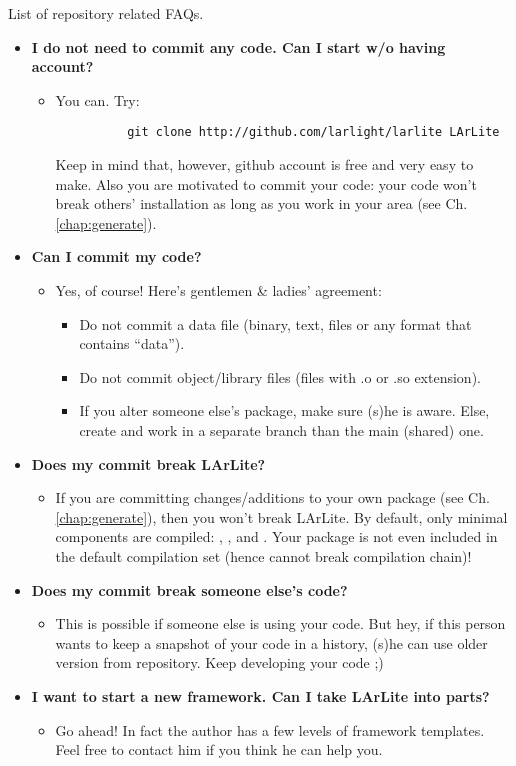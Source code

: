 List of repository related FAQs.

\begin{itemize}

  \item[]{\bf I do not need to commit any code. Can I start w/o having \git account?}
    \begin{itemize}
      \item You can. Try:
        \begin{lstlisting}
          git clone http://github.com/larlight/larlite LArLite
        \end{lstlisting}
        Keep in mind that, however, github account is free and very easy to make. Also you are motivated to commit your code: your code won't break others' installation as long as you work in your area (see Ch.\ref{chap:generate}).
    \end{itemize}

  \item[]{\bf Can I commit my code?}
    \begin{itemize}
      \item Yes, of course! Here's gentlemen \& ladies' agreement:
        \begin{itemize}
          \item Do not commit a data file (binary, text, \ROOT files or any format that contains ``data'').
          \item Do not commit object/library files (files with {\ttfamily *.o} or {\ttfamily *.so} extension).
          \item If you alter someone else's package, make sure (s)he is aware. Else, create and work in a separate \git branch than the main (shared) one.
        \end{itemize}
    \end{itemize}

  \item[] {\bf Does my commit break LArLite?}
    \begin{itemize}
      \item If you are committing changes/additions to your own package (see Ch.\ref{chap:generate}), then you won't break LArLite. By default, only minimal components are compiled: \Base, \DataFormat, and \Analysis. Your package is not even included in the default compilation set (hence cannot break compilation chain)! 
    \end{itemize}

  \item[] {\bf Does my commit break someone else's code?}
    \begin{itemize}
      \item This is possible if someone else is using your code. But hey, if this person wants to keep a snapshot of your code in a history, (s)he can use older version from \git repository. Keep developing your code ;)
    \end{itemize}

  \item[] {\bf I want to start a new \CPP framework. Can I take LArLite into parts?}
    \begin{itemize}
      \item Go ahead! In fact the author has a few levels of framework templates. Feel free to contact him if you think he can help you.
    \end{itemize}

\end{itemize}

